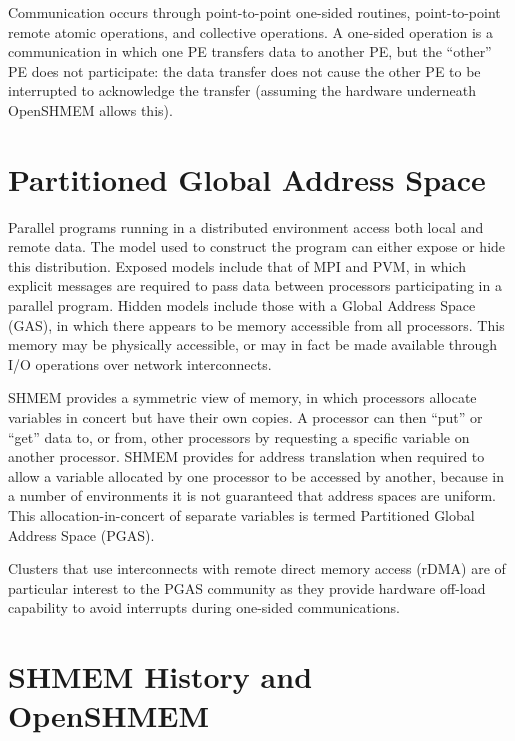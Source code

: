 \documentclass[english]{article}
\begin{document}
Communication occurs through point-to-point one-sided routines,
point-to-point remote atomic operations, and collective operations. A
one-sided operation is a communication in which one PE transfers data
to another PE, but the ``other'' PE does not participate: the data
transfer does not cause the other PE to be interrupted to acknowledge
the transfer (assuming the hardware underneath OpenSHMEM allows this).

\section{Partitioned Global Address Space}

Parallel programs running in a distributed environment access both
local and remote data. The model used to construct the program can
either expose or hide this distribution. Exposed models include that
of MPI and PVM, in which explicit messages are required to pass data
between processors participating in a parallel program. Hidden models
include those with a Global Address Space (GAS), in which there
appears to be memory accessible from all processors. This memory may
be physically accessible, or may in fact be made available through I/O
operations over network interconnects.

SHMEM provides a symmetric view of memory, in which processors
allocate variables in concert but have their own copies. A processor
can then ``put'' or ``get'' data to, or from, other processors by
requesting a specific variable on another processor. SHMEM provides
for address translation when required to allow a variable allocated by
one processor to be accessed by another, because in a number of
environments it is not guaranteed that address spaces are
uniform. This allocation-in-concert of separate variables is termed
Partitioned Global Address Space (PGAS).

Clusters that use interconnects with remote direct memory access
(rDMA) are of particular interest to the PGAS community as they
provide hardware off-load capability to avoid interrupts during
one-sided communications.

\section{SHMEM History and OpenSHMEM}
\end{document}
